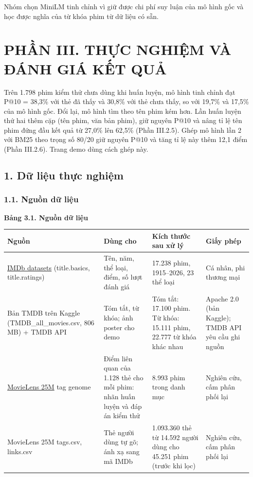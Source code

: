 \documentclass[12pt,a4paper]{article}
\newcommand{\np}{\Needspace{8\baselineskip}}
\let\oldsubsection\subsection
\renewcommand{\subsection}{\Needspace{12\baselineskip}\oldsubsection}
\let\oldsubsubsection\subsubsection
\renewcommand{\subsubsection}{\Needspace{10\baselineskip}\oldsubsubsection}
\newcommand{\chap}[1]{\clearpage\section{#1}}
\begin{document}
Nhóm chọn MiniLM tinh chỉnh vì giữ được chi phí suy luận của mô hình gốc và học được nghĩa của từ khóa phim từ dữ liệu có sẵn.

\chap{PHẦN III. THỰC NGHIỆM VÀ ĐÁNH GIÁ KẾT QUẢ}

Trên 1.798 phim kiểm thử chưa dùng khi huấn luyện, mô hình tinh chỉnh đạt P@10 = 38,3\% với thẻ đã thấy và 30,8\% với thẻ chưa thấy, so với 19,7\% và 17,5\% của mô hình gốc. Đổi lại, mô hình tìm theo tên phim kém hơn. Lần huấn luyện thứ hai thêm cặp (tên phim, văn bản phim), giữ nguyên P@10 và nâng tỉ lệ tên phim đứng đầu kết quả từ 27,0\% lên 62,5\% (Phần III.2.5). Ghép mô hình lần 2 với BM25 theo trọng số 80/20 giữ nguyên P@10 và tăng tỉ lệ này thêm 12,1 điểm (Phần III.2.6). Trang demo dùng cách ghép này.

\subsection{1. Dữ liệu thực nghiệm}

\subsubsection{1.1. Nguồn dữ liệu}

\np\textbf{Bảng 3.1. Nguồn dữ liệu}

{\def\LTcaptype{}\small
\begin{longtable}[]{@{}*{4}{P{(\linewidth - 6\tabcolsep) * }}@{}}
\toprule
\textbf{Nguồn} & \textbf{Dùng cho} & \textbf{Kích thước sau xử lý} & \textbf{Giấy phép} \\
\midrule
\endhead
\bottomrule
\endlastfoot
\href{https://datasets.imdbws.com/}{IMDb datasets} (title.basics, title.ratings) & Tên, năm, thể loại, điểm, số lượt đánh giá & 17.238 phim, 1915--2026, 23 thể loại & Cá nhân, phi thương mại \\
Bản TMDB trên Kaggle (TMDB\_\allowbreak all\_\allowbreak movies.csv, 806 MB) + TMDB API & Tóm tắt, từ khóa; ảnh poster cho demo & Tóm tắt: 17.100 phim. Từ khóa: 15.111 phim, 22.777 từ khóa khác nhau & Apache 2.0 (bản Kaggle); TMDB API yêu cầu ghi nguồn \\
\href{https://grouplens.org/datasets/movielens/25m/}{MovieLens 25M} tag genome & Điểm liên quan của 1.128 thẻ cho mỗi phim: nhãn huấn luyện và đáp án kiểm thử & 8.993 phim trong danh mục & Nghiên cứu, cấm phân phối lại \\
MovieLens 25M tags.csv, links.csv & Thẻ người dùng tự gõ; ánh xạ sang mã IMDb & 1.093.360 thẻ từ 14.592 người dùng cho 45.251 phim (trước khi lọc) & Nghiên cứu, cấm phân phối lại \\
\end{longtable}
}
\end{document}
